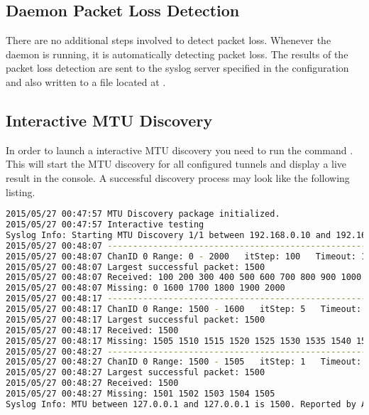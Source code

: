 \subsection{Daemon Packet Loss Detection}
There are no additional steps involved to detect packet loss. Whenever the daemon is running, it is automatically detecting packet loss. The results of the packet loss detection are sent to the syslog server specified in the configuration and also written to a file located at .

\subsection{Interactive MTU Discovery}
In order to launch a interactive \acs{MTU} discovery you need to run the command . This will start the \acs{MTU} discovery for all configured tunnels and display a live result in the console. A successful discovery process may look like the following listing.

\begin{lstlisting}[language=bash, caption=Successful MTU Discovery]
2015/05/27 00:47:57 MTU Discovery package initialized.
2015/05/27 00:47:57 Interactive testing
Syslog Info: Starting MTU Discovery 1/1 between 192.168.0.10 and 192.168.0.11. Reported by AppID 97691.
2015/05/27 00:48:07 ---------------------------------------------------
2015/05/27 00:48:07 ChanID 0 Range: 0 - 2000   itStep: 100   Timeout: 10ns
2015/05/27 00:48:07 Largest successful packet: 1500
2015/05/27 00:48:07 Received: 100 200 300 400 500 600 700 800 900 1000 1100 1200 1300 1400 1500 
2015/05/27 00:48:07 Missing: 0 1600 1700 1800 1900 2000 
2015/05/27 00:48:17 ---------------------------------------------------
2015/05/27 00:48:17 ChanID 0 Range: 1500 - 1600   itStep: 5   Timeout: 10ns
2015/05/27 00:48:17 Largest successful packet: 1500
2015/05/27 00:48:17 Received: 1500 
2015/05/27 00:48:17 Missing: 1505 1510 1515 1520 1525 1530 1535 1540 1545 1550 1555 1560 1565 1570 1575 1580 1585 1590 1595 1600 
2015/05/27 00:48:27 ---------------------------------------------------
2015/05/27 00:48:27 ChanID 0 Range: 1500 - 1505   itStep: 1   Timeout: 10ns
2015/05/27 00:48:27 Largest successful packet: 1500
2015/05/27 00:48:27 Received: 1500 
2015/05/27 00:48:27 Missing: 1501 1502 1503 1504 1505 
Syslog Info: MTU between 127.0.0.1 and 127.0.0.1 is 1500. Reported by AppID 97691.
\end{lstlisting}

